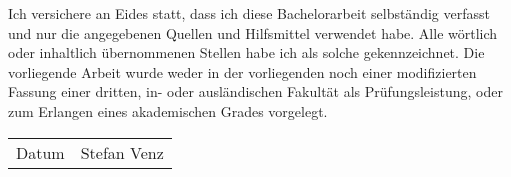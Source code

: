 \newcommand{\theauthor}{Stefan Venz}
\pagestyle{empty}

\setlength{\parindent}{0in}
Ich versichere an Eides statt, dass ich diese Bachelorarbeit selbständig verfasst und nur die angegebenen Quellen und Hilfsmittel verwendet habe.
%
Alle wörtlich oder inhaltlich übernommenen Stellen habe ich als solche gekennzeichnet.
%
Die vorliegende Arbeit wurde weder in der vorliegenden noch einer modifizierten Fassung einer dritten, in- oder ausländischen Fakultät als Prüfungsleistung, oder zum Erlangen eines akademischen Grades vorgelegt.

\vspace{1cm}

\begin{flushright}
	\begin{tabular}{p{2cm}p{6cm}}
		\hline
		Datum & \theauthor
		\smallskip
	\end{tabular}
\end{flushright}
